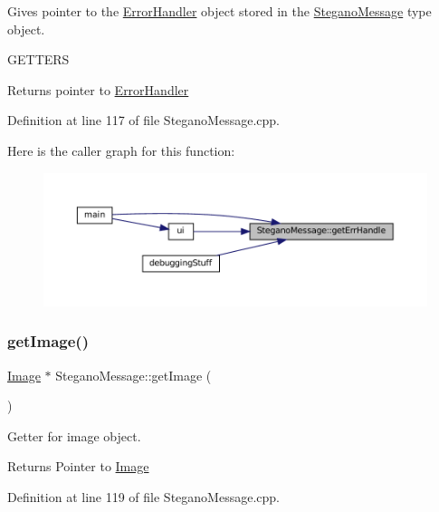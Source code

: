 Gives pointer to the \mbox{\hyperlink{classErrorHandler}{Error\+Handler}} object stored in the \mbox{\hyperlink{classSteganoMessage}{Stegano\+Message}} type object. 

G\+E\+T\+T\+E\+RS\begin{DoxyReturn}{Returns}
pointer to \mbox{\hyperlink{classErrorHandler}{Error\+Handler}} 
\end{DoxyReturn}


Definition at line 117 of file Stegano\+Message.\+cpp.

Here is the caller graph for this function\+:
\nopagebreak
\begin{figure}[H]
\begin{center}
\leavevmode
\includegraphics[width=350pt]{classSteganoMessage_a0134757a8c79caa9dca9bcce0686d1ef_icgraph}
\end{center}
\end{figure}
\mbox{\label{classSteganoMessage_a2e3ad705a0219edfd2150f3f7931979c}} 
\subsubsection{\texorpdfstring{getImage()}{getImage()}}
{\footnotesize\ttfamily \mbox{\hyperlink{classImage}{Image}} $\ast$ Stegano\+Message\+::get\+Image (\begin{DoxyParamCaption}{ }\end{DoxyParamCaption})}



Getter for image object. 

\begin{DoxyReturn}{Returns}
Pointer to \mbox{\hyperlink{classImage}{Image}} 
\end{DoxyReturn}


Definition at line 119 of file Stegano\+Message.\+cpp.

